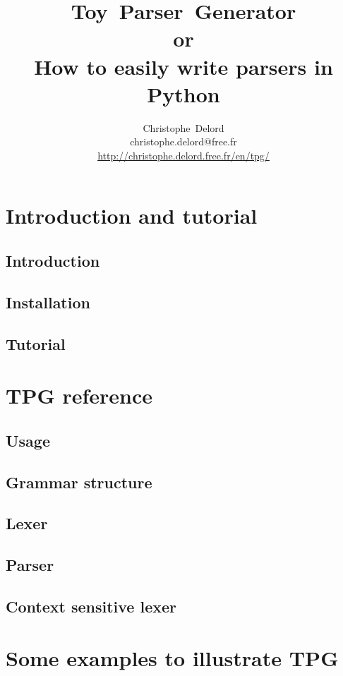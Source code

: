 \documentclass[a4paper,twoside]{report}
\author{
	Christophe~Delord\\
	christophe.delord@free.fr \\
	\url{http://christophe.delord.free.fr/en/tpg/} \\
}
\title{
	Toy~Parser~Generator \\
	or\\
	How to easily write parsers in Python \\
}
\begin{document}
\maketitle
\tableofcontents

\listoffigures

\cleardoublepage
\part{Introduction and tutorial}							\label{tpg:intro}
	\chapter{Introduction}
		
	\chapter{Installation}
		
	\chapter{Tutorial}										\label{tpg:tutorial}
		

\cleardoublepage
\part{TPG reference}										\label{tpg:core}
	\chapter{Usage}
		
	\chapter{Grammar structure}
		
	\chapter{Lexer}
		
	\chapter{Parser}
		
	\chapter{Context sensitive lexer}						\label{tpg:CSL}
		

\cleardoublepage
\part{Some examples to illustrate TPG}						\label{tpg:examples}
\end{document}
